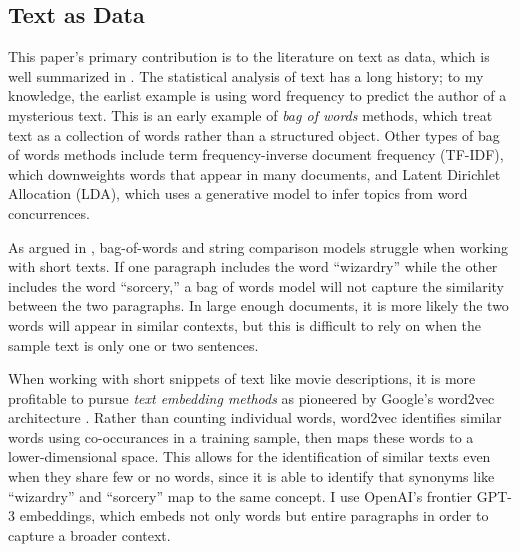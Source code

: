 \documentclass{article}
\begin{document}
\subsection{Text as Data}

This paper's primary contribution is to the literature on text as data, which is well summarized in \textcite{gentzkow2019EL}. The statistical analysis of text has a long history; to my knowledge, the earlist example is \textcite{mendenhall1887S} using word frequency to predict the author of a mysterious text. This is an early example of \emph{bag of words} methods, which treat text as a collection of words rather than a structured object. Other types of bag of words methods include term frequency-inverse document frequency (TF-IDF), which downweights words that appear in many documents, and Latent Dirichlet Allocation (LDA), which uses a generative model to infer topics from word concurrences.

As argued in \textcite{kenter2015P2AICIKM}, bag-of-words and string comparison models struggle when working with short texts. If one paragraph includes the word ``wizardry'' while the other includes the word ``sorcery,'' a bag of words model will not capture the similarity between the two paragraphs. In large enough documents, it is more likely the two words will appear in similar contexts, but this is difficult to rely on when the sample text is only one or two sentences. 

When working with short snippets of text like movie descriptions, it is more profitable to pursue \emph{text embedding methods} as pioneered by Google's word2vec architecture \parencite{mikolov2013}. Rather than counting individual words, word2vec identifies similar words using co-occurances in a training sample, then maps these words to a lower-dimensional space. This allows for the identification of similar texts even when they share few or no words, since it is able to identify that synonyms like ``wizardry'' and ``sorcery'' map to the same concept. I use OpenAI's frontier GPT-3 embeddings, which embeds not only words but entire paragraphs in order to capture a broader context.

\end{document}
